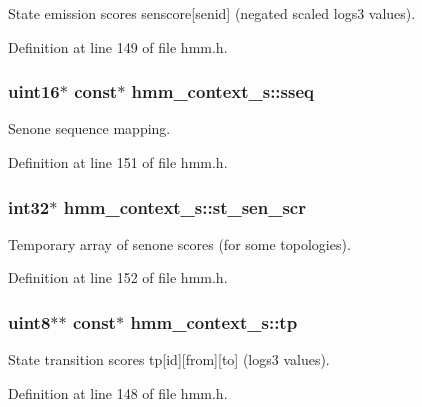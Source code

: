 State emission scores senscore[senid] (negated scaled logs3 values). 



Definition at line 149 of file hmm.\+h.

\subsubsection[{sseq}]{\setlength{\rightskip}{0pt plus 5cm}uint16$\ast$ const$\ast$ hmm\+\_\+context\+\_\+s\+::sseq}\label{structhmm__context__s_abbb0a32aadcc1938d9f21b04204c52da}


Senone sequence mapping. 



Definition at line 151 of file hmm.\+h.

\subsubsection[{st\+\_\+sen\+\_\+scr}]{\setlength{\rightskip}{0pt plus 5cm}int32$\ast$ hmm\+\_\+context\+\_\+s\+::st\+\_\+sen\+\_\+scr}\label{structhmm__context__s_a671c02e0443f41914471a7acfac6125c}


Temporary array of senone scores (for some topologies). 



Definition at line 152 of file hmm.\+h.

\subsubsection[{tp}]{\setlength{\rightskip}{0pt plus 5cm}uint8$\ast$$\ast$ const$\ast$ hmm\+\_\+context\+\_\+s\+::tp}\label{structhmm__context__s_a9ef2d83f67525050bea8b05f8a118f44}


State transition scores tp[id][from][to] (logs3 values). 



Definition at line 148 of file hmm.\+h.

